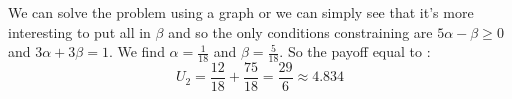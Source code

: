 We can solve the problem using a graph or we can simply see that it's more interesting to put all in $\beta$ and so the only conditions constraining are $5\alpha - \beta \ge 0$ and $3\alpha + 3\beta = 1$. We find $\alpha=\frac{1}{18}$ and $\beta=\frac{5}{18}$. So the payoff equal to :
\begin{equation*}
    U_2 = \frac{12}{18}+\frac{75}{18} = \frac{29}{6} \approx 4.834
\end{equation*}

